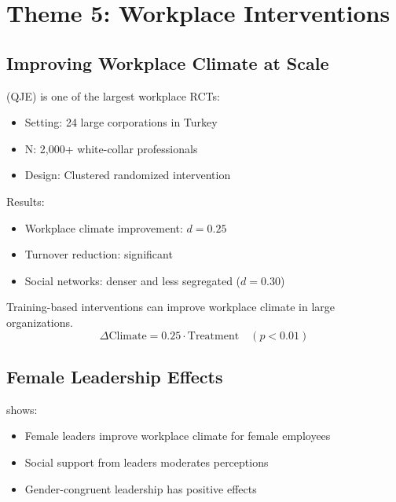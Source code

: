 \section{Theme 5: Workplace Interventions}
\label{sec:su-workplace}

\subsection{Improving Workplace Climate at Scale}

\citet{alan2023workplace} (QJE) is one of the largest workplace RCTs:
\begin{itemize}
\item Setting: 24 large corporations in Turkey
\item N: 2,000+ white-collar professionals
\item Design: Clustered randomized intervention
\end{itemize}

Results:
\begin{itemize}
\item Workplace climate improvement: $d = 0.25$
\item Turnover reduction: significant
\item Social networks: denser and less segregated ($d = 0.30$)
\end{itemize}

\begin{tcolorbox}[colback=green!5!white, colframe=green!75!black,
    title=Key Result SU-6: Scalable Workplace Interventions]
Training-based interventions can improve workplace climate in large organizations.
\begin{equation}
\Delta \text{Climate} = 0.25 \cdot \text{Treatment} \quad (p < 0.01)
\end{equation}
\end{tcolorbox}

\subsection{Female Leadership Effects}

\citet{alan2024female} shows:
\begin{itemize}
\item Female leaders improve workplace climate for female employees
\item Social support from leaders moderates perceptions
\item Gender-congruent leadership has positive effects
\end{itemize}


